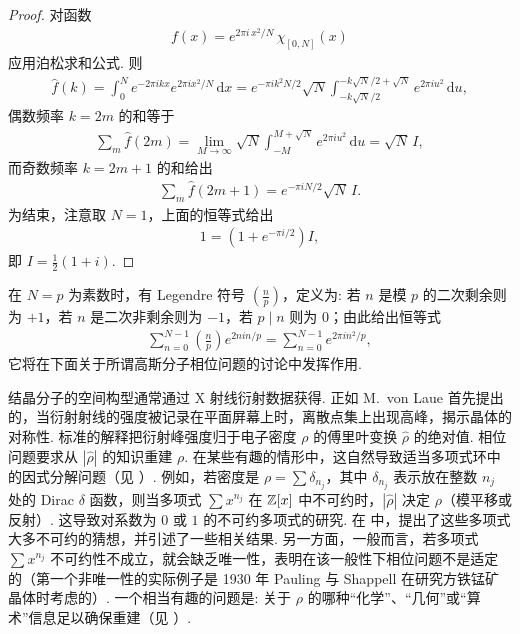 \begin{proof}
对函数
\begin{align*}
  f(x)=e^{2\pi i\,x^{2}/N}\,\chi_{[0,N]}(x)
\end{align*}
应用泊松求和公式. 则
\begin{align*}
  \widehat{f}(k)=\int_{0}^{N}e^{-2\pi i k x}e^{2\pi i x^{2}/N}\,\mathrm{d}x
  =e^{-\pi i k^{2}N/2}\sqrt{N}
   \int_{-k\sqrt{N}/2}^{-k\sqrt{N}/2+\sqrt{N}}e^{2\pi i u^{2}}\,\mathrm{d}u,
\end{align*}
偶数频率 $k = 2m$ 的和等于
\begin{align*}
  \sum_{m}\widehat{f}(2m)
  =\lim_{M\to\infty}\sqrt{N}\int_{-M}^{M+\sqrt{N}}e^{2\pi i u^{2}}\,\mathrm{d}u
  =\sqrt{N}\,I,
\end{align*}
而奇数频率 $k = 2m + 1$ 的和给出
\begin{align*}
  \sum_{m}\widehat{f}(2m+1)=e^{-\pi i N/2}\sqrt{N}\,I.
\end{align*}
为结束，注意取 $N = 1$，上面的恒等式给出
\begin{align*}
  1=\left(1+e^{-\pi i/2}\right)I,
\end{align*}
即 $I = \frac{1}{2}(1 + i)$.
\end{proof}

在 $N = p$ 为素数时，有 Legendre 符号 $\left(\frac{n}{p}\right)$，定义为: 若 $n$ 是模 $p$ 的二次剩余则为 $+1$，若 $n$ 是二次非剩余则为 $-1$，若 $p \mid n$ 则为 $0$；由此给出恒等式
\begin{align*}
  \sum_{n=0}^{N-1}\left(\frac{n}{p}\right)e^{2ni n/p}=\sum_{n=0}^{N-1}e^{2\pi i n^{2}/p},
\end{align*}
它将在下面关于所谓高斯分子相位问题的讨论中发挥作用.

结晶分子的空间构型通常通过 X 射线衍射数据获得. 正如 M.~von Laue 首先提出的，当衍射射线的强度被记录在平面屏幕上时，离散点集上出现高峰，揭示晶体的对称性. 标准的解释把衍射峰强度归于电子密度 $\rho$ 的傅里叶变换 $\widehat{\rho}$ 的绝对值. 相位问题要求从 $|\widehat{\rho}|$ 的知识重建 $\rho$. 在某些有趣的情形中，这自然导致适当多项式环中的因式分解问题（见 \cite{b170}）. 例如，若密度是 $\rho = \sum \delta_{n_j}$，其中 $\delta_{n_j}$ 表示放在整数 $n_j$ 处的 Dirac $\delta$ 函数，则当多项式 $\sum x^{n_j}$ 在 $\mathbb{Z}[x]$ 中不可约时，$|\widehat{\rho}|$ 决定 $\rho$（模平移或反射）. 这导致对系数为 $0$ 或 $1$ 的不可约多项式的研究. 在 \cite{b168} 中，提出了这些多项式大多不可约的猜想，并引述了一些相关结果. 另一方面，一般而言，若多项式 $\sum x^{n_j}$ 不可约性不成立，就会缺乏唯一性，表明在该一般性下相位问题不是适定的（第一个非唯一性的实际例子是 1930 年 Pauling 与 Shappell \cite{b169} 在研究方铁锰矿晶体时考虑的）. 一个相当有趣的问题是: 关于 $\rho$ 的哪种``化学''、``几何''或``算术''信息足以确保重建（见 \cite{b160,b170}）.

